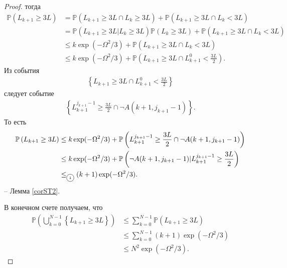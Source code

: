 \documentclass[11pt,a4]{article}
\newcommand*\circled[1]{\tikz[baseline=(char.base)]{
		\node[shape=circle,draw,inner sep=2pt] (char) {#1};}}
\begin{document}
\begin{proof}
тогда
\begin{align*}
\mathbb{P}\left(L_{k+1} \geq 3L\right) &= \mathbb{P}\left(L_{k+1} \geq 3L \cap L_{k} \geq 3L\right) + \mathbb{P}\left(L_{k+1} \geq 3L \cap L_{k} < 3L\right)\\
&= \mathbb{P}\left(L_{k+1} \geq 3L |L_{k} \geq 3L\right)\mathbb{P}\left(L_{k} \geq 3L\right) + \mathbb{P}\left(L_{k+1} \geq 3L \cap L_{k} < 3L\right)\\
&\leq k\exp(-\Omega^2/3) + \mathbb{P}\left(L_{k+1} \geq 3L \cap L_{k} < 3L\right)\\
&\leq k\exp(-\Omega^2/3) + \mathbb{P}\left(L_{k+1} \geq 3L \cap L_{k+1}^0 < \frac{3L}{2}\right).
\end{align*}
Из события \begin{align*}\left\{L_{k+1} \geq 3L \cap L_{k+1}^0 < \frac{3L}{2}\right\}\end{align*} следует событие \begin{align*}\left\{L_{k+1}^{j_{k+1} - 1} \geq \frac{3L}{2} \cap \neg A(k+1,j_{k+1} - 1)\right\}.\end{align*}
То есть
\begin{align*}
\mathbb{P}\left(L_{k+1} \geq 3L\right) 
&\leq k\exp(-\Omega^2/3) + \mathbb{P}\left(L_{k+1}^{j_{k+1} - 1} \geq \frac{3L}{2} \cap \neg A(k+1,j_{k+1} - 1)\right)\\
&\leq k\exp(-\Omega^2/3) + \mathbb{P}\left(\neg A(k+1,j_{k+1} - 1) | L_{k+1}^{j_{k+1} - 1} \geq \frac{3L}{2}\right)\\
&\leq_{{\tiny \circled{1}}} (k+1)\exp(-\Omega^2/3).
\end{align*}
{\small \circled{1}} -- Лемма \ref{corST2}.

В конечном счете получаем, что
\begin{align*}
\mathbb{P}\left(\bigcup_{k=0}^{N-1}\left\{L_{k+1} \geq 3L\right\}\right) 
&\leq \sum_{k = 0}^{N - 1}\mathbb{P}\left(L_{k+1} \geq 3L\right)\\
&\leq \sum_{k = 0}^{N - 1}(k+1)\exp(-\Omega^2/3)\\
&\leq N^2\exp(-\Omega^2/3).
\end{align*}
\iffalse
Пусть $j_1 = 0$, тогда, очевидно,
\begin{align*}
\mathbb{P}\left(L_{1} > 3L\right) &= 0.
\end{align*}
Пусть $j_1 > 0$, тогда
\begin{align*}
\mathbb{P}\left(L_{1} > 3L\right)
&= \mathbb{P}\left(A(1, j_1 - 1) \cap L_{1} > 3L\right) + \mathbb{P}\left(\neg A(1, j_1 - 1) \cap L_{1} > 3L\right).
\end{align*}
Вероятность $\mathbb{P}\left(A(1, j_1 - 1) \cap L_{1} > 3L\right) = 0$, так как события $A(1, j_1 - 1)$ и $L_{1} > 3L$ не пересекаются, потому что внутренний цикл закончился бы с $j_k - 1$, а не с $j_k$.
\fi


\end{proof}
\end{document}
